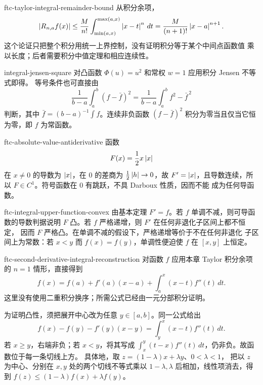 \begin{solution}{ftc-taylor-integral-remainder-bound}
从积分余项，
\[
 \left|R_{n,a}f(x)\right|
 \le\frac{M}{n!}\int_{\min(a,x)}^{\max(a,x)}
       \left|x-t\right|^n\,dt
 =\frac{M}{(n+1)!}\left|x-a\right|^{n+1}.
\]
这个论证只把整个积分用统一上界控制，没有证明积分等于某个中间点函数值
乘以长度；后者需要积分中值定理和相应连续性。
\end{solution}

\begin{solution}{integral-jensen-square}
对凸函数 \(\Phi(u)=u^2\) 和常权 \(w=1\) 应用积分 Jensen 不等式即得。
等号条件也可直接由
\[
 \frac1{b-a}\int_a^b(f-\bar f)^2
 =\frac1{b-a}\int_a^b f^2-\bar f^{\,2}
\]
判断，其中 \(\bar f=(b-a)^{-1}\int f\)。连续非负函数
\((f-\bar f)^2\) 积分为零当且仅当它恒为零，即 \(f\) 为常函数。
\end{solution}

\begin{solution}{ftc-absolute-value-antiderivative}
函数
\[
 F(x)=\frac12x\left|x\right|
\]
在 \(x\ne0\) 的导数为 \(\left|x\right|\)，在 \(0\) 的差商为
\(\frac12\left|h\right|\to0\)，故 \(F'=\left|x\right|\)，且导数连续，所以
\(F\in C^1\)。符号函数在 \(0\) 有跳跃，不具 Darboux 性质，因而不能
成为任何导函数。
\end{solution}

\begin{solution}{ftc-integral-upper-function-convex}
由基本定理 \(F'=f\)。若 \(f\) 单调不减，则可导函数的导数判据说明
\(F\) 凸。若 \(f\) 严格递增，则 \(F'\) 在任何非退化子区间上都不恒定，
因而 \(F\) 严格凸。在单调不减的假设下，严格递增等价于不在任何非退化
子区间上为常数：若 \(x<y\) 而 \(f(x)=f(y)\)，单调性便迫使
\(f\) 在 \([x,y]\) 上恒定。
\end{solution}

\begin{solution}{ftc-second-derivative-integral-reconstruction}
对函数 \(f\) 应用本章 Taylor 积分余项的 \(n=1\) 情形，直接得到
\[
 f(x)=f(a)+f'(a)(x-a)+\int_a^x(x-t)f''(t)\,dt.
\]
这里没有使用二重积分换序；所需公式已经由一元分部积分证明。

为证明凸性，须把展开中心改为任意 \(y\in[a,b]\)。同一公式给出
\[
 f(x)-f(y)-f'(y)(x-y)=\int_y^x(x-t)f''(t)\,dt.
\]
若 \(x\ge y\)，右端非负；若 \(x<y\)，将其写成
\(\int_x^y(t-x)f''(t)\,dt\)，仍非负。故函数位于每一条切线上方。
具体地，取 \(z=(1-\lambda)x+\lambda y\)、\(0<\lambda<1\)，
把以 \(z\) 为中心、分别在 \(x,y\) 处的两个切线不等式乘以
\(1-\lambda,\lambda\) 后相加，线性项消去，得到
\(f(z)\le(1-\lambda)f(x)+\lambda f(y)\)。
\end{solution}

